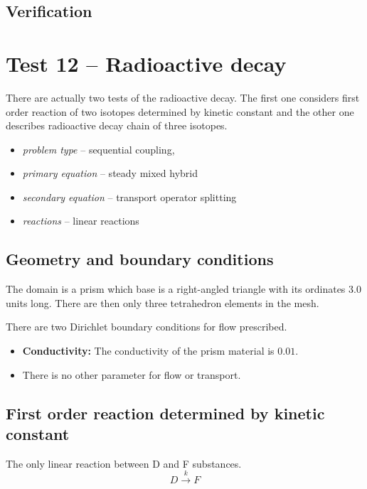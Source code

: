 \subsection*{Verification}



\section{Test 12 -- Radioactive decay}
There are actually two tests of the radioactive decay. The first one considers first order reaction of two isotopes determined by kinetic constant and the other one describes radioactive decay chain of three isotopes.

\begin{itemize} 
    \item \emph{problem type} -- sequential coupling, 
    \item \emph{primary equation} -- steady mixed hybrid
    \item \emph{secondary equation} -- transport operator splitting
    \item \emph{reactions} -- linear reactions
  \end{itemize}

\subsection*{Geometry and boundary conditions}
The domain is a prism which base is a right-angled triangle with its ordinates 3.0 units long. There are then only three tetrahedron elements in the mesh.

There are two Dirichlet boundary conditions for flow prescribed.

\begin{itemize}
  \item \textbf{Conductivity:} The conductivity of the prism material is $0.01$. 
  \item There is no other parameter for flow or transport.
\end{itemize}



\subsection{First order reaction determined by kinetic constant}
The only linear reaction between D and F substances.
\[
D\xrightarrow{k}F
\]

